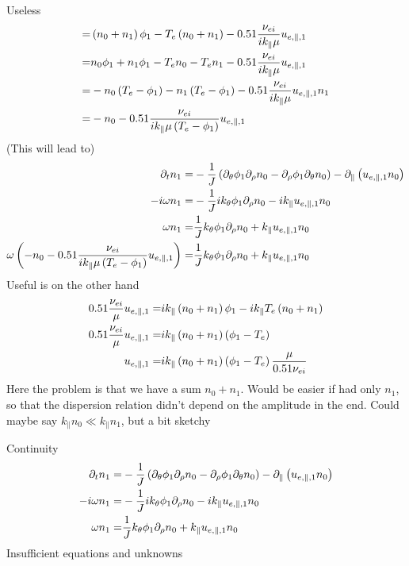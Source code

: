 Useless
\begin{align*}
=&
\left( n_0 + n_1\right) \phi_1
- T_e \left( n_0 + n_1 \right)
- 0.51 \frac{\nu_{ei}}{ik_\|\mu }  u_{e,\|,1}
  \\
=&
n_0 \phi_1+ n_1 \phi_1
- T_e  n_0 - T_e n_1
- 0.51 \frac{\nu_{ei}}{ik_\|\mu }  u_{e,\|,1}
  \\
=&
- n_0 \left(T_e - \phi_1\right)
- n_1 \left(T_e - \phi_1\right)
- 0.51 \frac{\nu_{ei}}{ik_\|\mu }  u_{e,\|,1}
  n_1
  \\
=&
- n_0
- 0.51 \frac{\nu_{ei}}{ik_\|\mu \left(T_e - \phi_1\right) }  u_{e,\|,1}
\end{align*}
(This will lead to)
\begin{align*}
 \partial_t n_1
=&
 -\frac{1}{J}\left(
  \partial_\theta\phi_1\partial_\rho n_0
 - \partial_\rho\phi_1\partial_\theta n_0
 \right)
 -  \partial_\| \left(u_{e,\|,1} n_0 \right)
 \\
 -i\omega n_1
=&
 -\frac{1}{J} ik_\theta\phi_1\partial_\rho n_0
 - ik_\|u_{e,\|,1} n_0
 \\
 \omega n_1
=&
 \frac{1}{J} k_\theta\phi_1\partial_\rho n_0
 + k_\|u_{e,\|,1} n_0
 \\
 \omega
 \left(
- n_0
- 0.51 \frac{\nu_{ei}}{ik_\|\mu \left(T_e - \phi_1\right) }  u_{e,\|,1}
 \right)
=&
 \frac{1}{J} k_\theta\phi_1\partial_\rho n_0
 + k_\|u_{e,\|,1} n_0
\end{align*}
Useful is on the other hand
\begin{align*}
    0.51 \frac{\nu_{ei}}{\mu }  u_{e,\|,1}
=&
ik_\|\L( n_0 + n_1\R) \phi_1
- ik_\|T_e \L( n_0 + n_1 \R)
\\
%
    0.51 \frac{\nu_{ei}}{\mu }  u_{e,\|,1}
=&
ik_\|\L( n_0 + n_1\R) \L(\phi_1 -T_e \R)
\\
%
     u_{e,\|,1}
=&
ik_\|\L( n_0 + n_1\R) \L(\phi_1 -T_e \R)
     \frac{\mu}{0.51\nu_{ei} }
\end{align*}
Here the problem is that we have a sum $n_0 + n_1$. Would be easier if had only
$n_1$, so that the dispersion relation didn't depend on the amplitude in the
end. Could maybe say $k_\|n_0 \ll k_\|n_1$, but a bit sketchy

Continuity
\begin{align*}
 \partial_t n_1
=&
 -\frac{1}{J}\left(
  \partial_\theta\phi_1\partial_\rho n_0
 - \partial_\rho\phi_1\partial_\theta n_0
 \right)
 -  \partial_\| \left(u_{e,\|,1} n_0 \right)
 \\
 -i\omega n_1
=&
 -\frac{1}{J} ik_\theta\phi_1\partial_\rho n_0
 - ik_\|u_{e,\|,1} n_0
 \\
 \omega n_1
=&
 \frac{1}{J} k_\theta\phi_1\partial_\rho n_0
 + k_\|u_{e,\|,1} n_0
\end{align*}
%
Insufficient equations and unknowns

